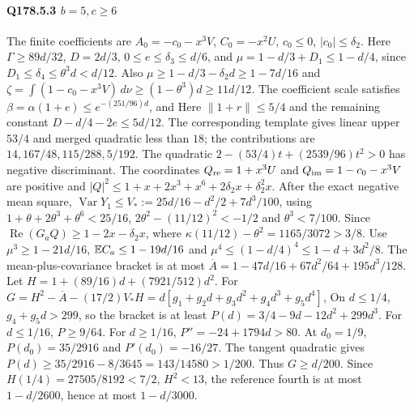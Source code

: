 \paragraph{Q178.5.3 $b=\allowbreak 5,\allowbreak c\ge\allowbreak 6$}
The finite coefficients are
$A_0=\allowbreak -c_0-x^3V$, $C_0=\allowbreak -x^2U$, $c_0\le\allowbreak 0$, $|c_0|\le\allowbreak \delta_2$.
Here $\Gamma\ge\allowbreak 89d/32$, $D=\allowbreak 2d/3$, $0\le\allowbreak  e\le\allowbreak \delta_3\le\allowbreak  d/6$,
and $\mu=\allowbreak 1-d/3+D_1\le\allowbreak 1-d/4$, since
$D_1\le\allowbreak \delta_4\le\allowbreak \theta^3d<\allowbreak d/12$.
Also $\mu\ge\allowbreak 1-d/3-\delta_2d\ge\allowbreak 1-7d/16$ and
$\zeta=\allowbreak \int(1-c_0-x^3V)\,\allowbreak d\nu\ge\allowbreak (1-\theta^3)d\ge\allowbreak 11d/12$.
The coefficient scale satisfies
$\beta=\allowbreak \alpha(1+e)\le\allowbreak  e^{-(251/96)d}$, and
Here $\|1+r\|\le\allowbreak 5/4$ and the remaining constant
$D-d/4-2e\le\allowbreak 5d/12$.
The corresponding template gives linear upper $53/4$ and merged
quadratic less than $18$; the contributions are
$14,\allowbreak 167/48,\allowbreak 115/288,\allowbreak 5/192$.
The quadratic $2-(53/4)t+(2539/96)t^2>\allowbreak 0$ has negative discriminant.
The coordinates $Q_{\rm re}=\allowbreak 1+x^3U$ and $Q_{\rm im}=\allowbreak 1-c_0-x^3V$
are positive and
$|Q|^2\le\allowbreak 1+x+2x^3+x^6+2\delta_2x+\delta_2^2x$.
After the exact negative mean square,
$\operatorname{Var}Y_1\le\allowbreak  V_*:=\allowbreak 25d/16-d^2/2+7d^3/100$,
using $1+\theta+2\theta^3+\theta^6<\allowbreak 25/16$,
$2\theta^2-(11/12)^2<\allowbreak -1/2$ and $\theta^3<\allowbreak 7/100$.
Since $\operatorname{Re}(G_aQ)\ge\allowbreak 1-2x-\delta_2x$,
where $\kappa(11/12)-\theta^2=\allowbreak 1165/3072>\allowbreak 3/8$.
Use $\mu^3\ge\allowbreak 1-21d/16$, $\mathbb E C_a\le\allowbreak 1-19d/16$ and
$\mu^4\le\allowbreak (1-d/4)^4\le\allowbreak 1-d+3d^2/8$.
The mean-plus-covariance bracket is at most
$\overline A=\allowbreak 1-47d/16+67d^2/64+195d^3/128$.
Let $H=\allowbreak 1+(89/16)d+(7921/512)d^2$.
For $G=H^2-\overline A-(17/2)V_*H
=d[g_1+g_2d+g_3d^2+g_4d^3+g_5d^4]$,
On $d\le\allowbreak 1/4$, $g_4+g_5d>\allowbreak 299$, so the bracket is at least
$P(d)=\allowbreak 3/4-9d-12d^2+299d^3$.
For $d\le\allowbreak 1/16$, $P\ge\allowbreak 9/64$.
For $d\ge\allowbreak 1/16$, $P''=\allowbreak -24+1794d>\allowbreak 80$.
At $d_0=\allowbreak 1/9$, $P(d_0)=\allowbreak 35/2916$ and $P'(d_0)=\allowbreak -16/27$.
The tangent quadratic gives
$P(d)\ge\allowbreak 35/2916-8/3645=\allowbreak 143/14580>\allowbreak 1/200$.
Thus $G\ge\allowbreak  d/200$. Since $H(1/4)=\allowbreak 27505/8192<\allowbreak 7/2$, $H^2<\allowbreak 13$,
the reference fourth is at most $1-d/2600$, hence at most $1-d/3000$.

